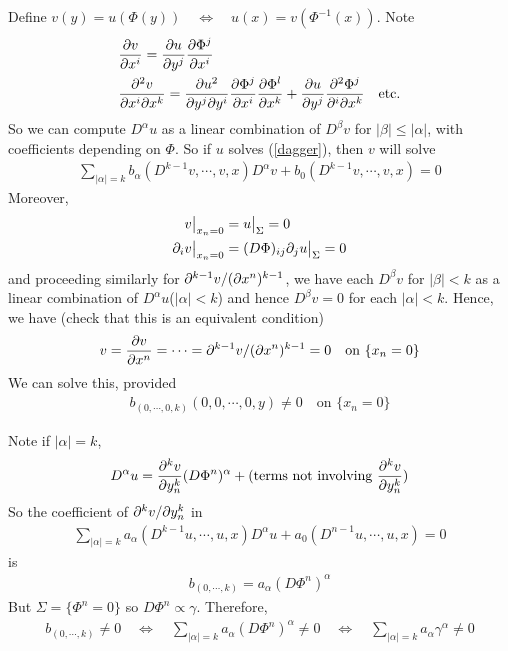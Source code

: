 \documentclass[10pt,a4paper]{report}
\begin{document}
Define $v(y) = u(\Phi(y)) \quad \Leftrightarrow \quad u(x) = v(\Phi^{-1}(x))$. Note
\begin{align*}
&\frac{\partial v}{\partial x^i} = \frac{\partial u}{\partial y^j} \frac{\partial \Phi^j}{\partial x^i} \\
&\frac{\partial^2 v}{\partial x^i \partial x^k} = \frac{\partial u^2}{\partial y^j \partial y^i} \frac{\partial \Phi^j}{\partial x^i} \frac{\partial \Phi^l}{\partial x^k} + \frac{\partial u}{\partial y^j} \frac{\partial^2 \Phi^j}{\partial^i \partial x^k} \quad \text{etc.}
\end{align*}
So we can compute $D^{\alpha} u$ as a linear combination of $D^{\beta}v$ for $|\beta| \leq |\alpha|$, with coefficients depending on $\Phi$. So if $u$ solves (\ref{dagger}), then $v$ will solve 
\begin{align*}
\sum_{|\alpha| =k} b_{\alpha}(D^{k-1}v, \cdots, v, x)D^{\alpha}v + b_0 (D^{k-1}v, \cdots, v, x) =0
\end{align*}
Moreover,
\begin{align*}
v \big|_{x_n =0} &= u \big|_{\Sigma} = 0 \\
\partial_i v \big|_{x_n =0} &= (D\Phi)_{ij} \partial_j u \big|_{\Sigma} = 0 
\end{align*}
and proceeding similarly for $\partial^{k-1} v / (\partial x^n)^{k-1}$, we have each $D^{\beta} v$ for $|\beta|<k$ as a linear combination of $D^{\alpha}u$($|\alpha|<k$) and hence $D^{\beta} v= 0$ for each $|\alpha|<k$. Hence, we have (check that this is an equivalent condition)
\begin{align*}
v = \frac{\partial v}{\partial x^n} = \cdots = \partial^{k-1} v / (\partial x^n)^{k-1} =0 \quad \text{on } \{ x_n =0 \}
\end{align*}
We can solve this, provided
\begin{align*}
b_{(0,\cdots,0, k)}(0,0, \cdots, 0, y) \neq 0 \quad \text{on } \{ x_n =0 \}
\end{align*}

Note if $|\alpha | = k$,
\begin{align*}
D^{\alpha}u = \frac{\partial^k v}{\partial y^k_n} (D\Phi^n)^{\alpha} + (\text{terms not involving } \frac{\partial^k v}{\partial y^k_n})
\end{align*}
So the coefficient of $\partial^k v / \partial y^k_n$ in
\begin{align*}
\sum_{|\alpha| =k} a_{\alpha}(D^{k-1}u, \cdots, u,x)D^{\alpha} u + a_0(D^{n-1}u, \cdots, u,x) =0
\end{align*}
is
\begin{align*}
b_{(0,\cdots,k)} = a_{\alpha}(D\Phi^n)^{\alpha}
\end{align*}
But $\Sigma = \{\Phi^n =0\}$ so $D\Phi^n \propto \gamma$. Therefore,
\begin{align*}
b_{(0,\cdots,k)} \neq 0 \quad \Leftrightarrow \quad \sum_{|\alpha|=k} a_{\alpha} (D\Phi^n)^{\alpha} \neq 0  \quad \Leftrightarrow \quad \sum_{|\alpha|=k} a_{\alpha} \gamma^{\alpha} \neq 0
\end{align*}
\s
\end{document}
